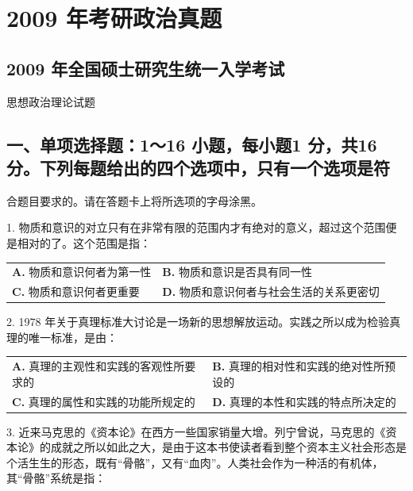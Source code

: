 \documentclass[UTF8,11pt]{ctexart}
\begin{document}
\section*{2009 年考研政治真题}
\subsection*{2009 年全国硕士研究生统一入学考试}

思想政治理论试题


\subsection*{一、单项选择题：1～16 小题，每小题1 分，共16 分。下列每题给出的四个选项中，只有一个选项是符}

合题目要求的。请在答题卡上将所选项的字母涂黑。


1. 物质和意识的对立只有在非常有限的范围内才有绝对的意义，超过这个范围便是相对的了。这个范围是指：


\begin{center}\begin{tabular}{>{\raggedright\arraybackslash}p{\dimexpr(\linewidth-4\tabcolsep)/2\relax}>{\raggedright\arraybackslash}p{\dimexpr(\linewidth-4\tabcolsep)/2\relax}}
\textbf{A.} 物质和意识何者为第一性 & \textbf{B.} 物质和意识是否具有同一性\\[.35em]
\textbf{C.} 物质和意识何者更重要 & \textbf{D.} 物质和意识何者与社会生活的关系更密切\\[.35em]\end{tabular}\end{center}

2. 1978 年关于真理标准大讨论是一场新的思想解放运动。实践之所以成为检验真理的唯一标准，是由：


\begin{center}\begin{tabular}{>{\raggedright\arraybackslash}p{\dimexpr(\linewidth-4\tabcolsep)/2\relax}>{\raggedright\arraybackslash}p{\dimexpr(\linewidth-4\tabcolsep)/2\relax}}
\textbf{A.} 真理的主观性和实践的客观性所要求的 & \textbf{B.} 真理的相对性和实践的绝对性所预设的\\[.35em]
\textbf{C.} 真理的属性和实践的功能所规定的 & \textbf{D.} 真理的本性和实践的特点所决定的\\[.35em]\end{tabular}\end{center}

3. 近来马克思的《资本论》在西方一些国家销量大增。列宁曾说，马克思的《资本论》的成就之所以如此之大，是由于这本书使读者看到整个资本主义社会形态是个活生生的形态，既有“骨骼”，又有“血肉”。人类社会作为一种活的有机体，其“骨骼”系统是指：
\end{document}
